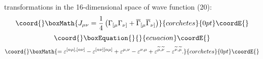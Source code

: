 \documentclass[a4paper,12pt]{article}
\begin{document}
transformations in the 16-dimensional space of wave function (20):
\[\coord{}\boxMath{
J_{\mu \nu }=\frac 14\left( \Gamma _{[\mu} \Gamma _{\nu ]}
+\overline{\Gamma }_{[\mu} \overline{\Gamma }_{\nu ]}\right)
}{corchetes}{0pt}\coordE{}\]
\vspace{-8mm}
\begin{equation}\coord{}\boxEquation{  \label{100}
}{  }{ecuacion}\coordE{}\end{equation}
\vspace{-8mm}
\[\coord{}\boxMath{
=\varepsilon ^{[\alpha\mu],[\alpha\nu]}- \varepsilon
^{[\alpha\nu][ \alpha\mu]} +\varepsilon ^{\mu,\nu}-\varepsilon
^{\nu,\mu} + \varepsilon^{\widetilde{\mu},\widetilde{\nu}} -
\varepsilon^{\widetilde{\nu},\widetilde{\mu}} .
}{corchetes}{0pt}\coordE{}\]

\begin{thebibliography}{99}


\end{thebibliography}
\end{document}
